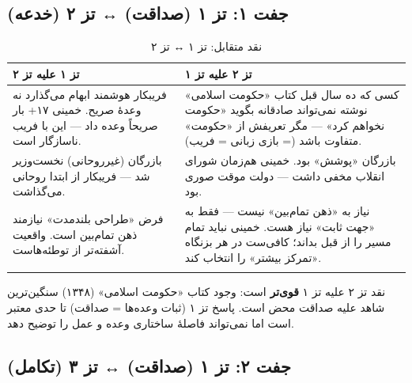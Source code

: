 \documentclass[12pt,a4paper]{book}
\newcommand{\keyword}[1]{\textbf{\textcolor{cPrimary}{#1}}}
\begin{document}
\subsection{جفت ۱: تز ۱ (صداقت) ↔ تز ۲ (خدعه)}

\begin{longtable}{%
    >{\raggedleft\arraybackslash}p{}
    >{\raggedleft\arraybackslash}p{}}
\toprule
\rowcolor{cGreen!10}
\textbf{تز ۱ علیه تز ۲} &
\rowcolor{cAccent!8}
\textbf{تز ۲ علیه تز ۱} \\
\midrule

فریبکار هوشمند ابهام می‌گذارد نه وعدهٔ صریح. خمینی ۱۷+ بار صریحاً وعده داد — این با فریب ناسازگار است. &
کسی که ده سال قبل کتاب «حکومت اسلامی» نوشته نمی‌تواند صادقانه بگوید «حکومت نخواهم کرد» — مگر تعریفش از «حکومت» متفاوت باشد (= بازی زبانی = فریب). \\
\midrule

بازرگان (غیرروحانی) نخست‌وزیر شد — فریبکار از ابتدا روحانی می‌گذاشت. &
بازرگان «پوشش» بود. خمینی هم‌زمان شورای انقلاب مخفی داشت — دولت موقت صوری بود. \\
\midrule

فرض «طراحی بلندمدت» نیازمند ذهن تمام‌بین است. واقعیت آشفته‌تر از توطئه‌هاست. &
نیاز به «ذهن تمام‌بین» نیست — فقط به «جهت ثابت» نیاز هست. خمینی نباید تمام مسیر را از قبل بداند؛ کافی‌ست در هر بزنگاه «تمرکز بیشتر» را انتخاب کند. \\

\bottomrule
\caption{نقد متقابل: تز ۱ ↔ تز ۲}
\end{longtable}

\begin{noteBox}
نقد تز ۲ علیه تز ۱ \keyword{قوی‌تر} است: وجود کتاب «حکومت اسلامی» (۱۳۴۸) سنگین‌ترین شاهد علیه صداقت محض است. پاسخ تز ۱ (ثبات وعده‌ها = صداقت) تا حدی معتبر است اما نمی‌تواند فاصلهٔ ساختاری وعده و عمل را توضیح دهد.
\end{noteBox}

\subsection{جفت ۲: تز ۱ (صداقت) ↔ تز ۳ (تکامل)}
\end{document}
